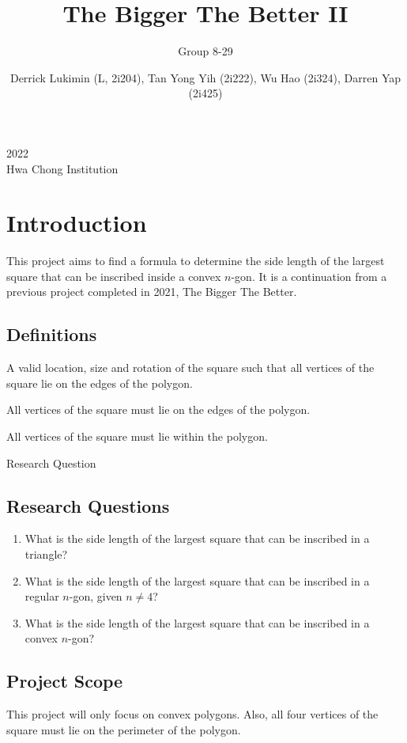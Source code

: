 \documentclass[12pt]{scrartcl}
\title{The Bigger The Better II}
\author{Group 8-29}
\date{Derrick Lukimin (L, 2i204), Tan Yong Yih (2i222), Wu Hao (2i324), Darren Yap (2i425)}
\begin{document}
\onehalfspacing
\maketitle
\begin{center}
\Large
2022 \\ 
Hwa Chong Institution
\end{center}
\tableofcontents

\section{Introduction}
This project aims to find a formula to determine
the side length of the largest square that can be
inscribed inside a convex $n$-gon. It is a continuation from
a previous project completed in 2021, The Bigger The Better. \cite{tbtb1}

\subsection{Definitions}
\begin{description}[font=\bfseries, leftmargin=1cm, style=nextline]
	\item[placement] A valid location, size and rotation of the square such that
		all vertices of the square lie on the edges of the polygon.
	\item[inscribed] All vertices of the square must lie on the edges of the polygon.
	\item[fit] All vertices of the square must lie within the polygon.
	\item[RQ] Research Question
\end{description}

\subsection{Research Questions}
\begin{enumerate}
	\item What is the side length of the largest square that can be inscribed in a triangle?
	\item What is the side length of the largest square that can be inscribed in a regular $n$-gon, given $n \neq 4$?
	\item What is the side length of the largest square that can be inscribed in a convex $n$-gon?
\end{enumerate}

\subsection{Project Scope}
This project will only focus on convex polygons. Also, all four vertices of the square must lie on the perimeter of the polygon.
\end{document}
